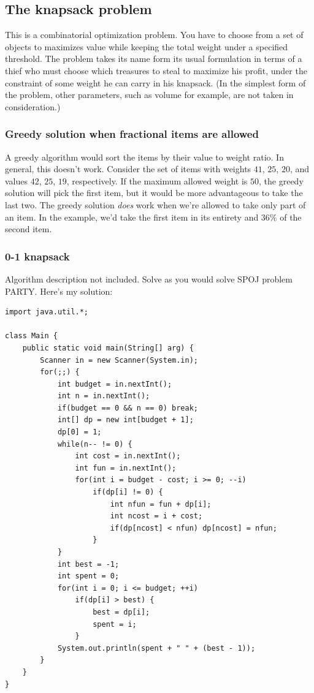 \documentclass[a4paper,12pt]{article}
\begin{document}
\subsection{The knapsack problem}

This is a combinatorial optimization problem. You have to choose from a set of objects to maximizes value while keeping the total weight under a specified threshold. The problem takes its name form its usual formulation in terms of a thief who must choose which treasures to steal to maximize his profit, under the constraint of some weight he can carry in his knapsack. (In the simplest form of the problem, other parameters, such as volume for example, are not taken in consideration.)

\subsubsection{Greedy solution when fractional items are allowed}

A greedy algorithm would sort the items by their value to weight ratio. In general, this doesn't work. Consider the set of items with weights $41$, $25$, $20$, and values $42$, $25$, $19$, respectively. If the maximum allowed weight is $50$, the greedy solution will pick the first item, but it would be more advantageous to take the last two. The greedy solution {\em does} work when we're allowed to take only part of an item. In the example, we'd take the first item in its entirety and $36\%$ of the second item.

\subsubsection{0-1 knapsack}

Algorithm description not included. Solve as you would solve SPOJ problem PARTY. Here's my solution:
\begin{lstlisting}
import java.util.*;

class Main {
	public static void main(String[] arg) {
		Scanner in = new Scanner(System.in);
		for(;;) {
			int budget = in.nextInt();
			int n = in.nextInt();
			if(budget == 0 && n == 0) break;
			int[] dp = new int[budget + 1];
			dp[0] = 1;
			while(n-- != 0) {
				int cost = in.nextInt();
				int fun = in.nextInt();
				for(int i = budget - cost; i >= 0; --i)
					if(dp[i] != 0) {
						int nfun = fun + dp[i];
						int ncost = i + cost;
						if(dp[ncost] < nfun) dp[ncost] = nfun;
					}
			}
			int best = -1;
			int spent = 0;
			for(int i = 0; i <= budget; ++i)
				if(dp[i] > best) {
					best = dp[i];
					spent = i;
				}
			System.out.println(spent + " " + (best - 1));
		}
	}
}
\end{lstlisting}
\end{document}
